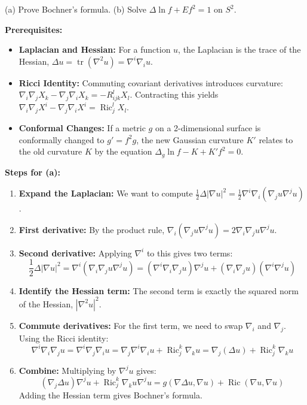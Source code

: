 \begin{exercise}
\label{geometry:2019:5}
(a) Prove Bochner's formula. (b) Solve $\Delta\ln f + Ef^{2} = 1$ on $S^2$.
\end{exercise}

\begin{solution}
\textbf{Prerequisites:}
\begin{itemize}
    \item \textbf{Laplacian and Hessian:} For a function $u$, the Laplacian is the trace of the Hessian, $\Delta u = \operatorname{tr}(\nabla^2 u) = \nabla^i \nabla_i u$.
    \item \textbf{Ricci Identity:} Commuting covariant derivatives introduces curvature: $\nabla_i \nabla_j X_k - \nabla_j \nabla_i X_k = -R_{ijk}^l X_l$. Contracting this yields $\nabla_i \nabla_j X^i - \nabla_j \nabla_i X^i = \operatorname{Ric}_j^l X_l$.
    \item \textbf{Conformal Changes:} If a metric $g$ on a 2-dimensional surface is conformally changed to $g' = f^2 g$, the new Gaussian curvature $K'$ relates to the old curvature $K$ by the equation $\Delta_g \ln f - K + K' f^2 = 0$.
\end{itemize}

\medskip
\textbf{Steps for (a):}
\begin{enumerate}
    \item \textbf{Expand the Laplacian:} We want to compute $\frac{1}{2} \Delta |\nabla u|^2 = \frac{1}{2} \nabla^i \nabla_i (\nabla_j u \nabla^j u)$.
    \item \textbf{First derivative:} By the product rule, $\nabla_i (\nabla_j u \nabla^j u) = 2 \nabla_i \nabla_j u \nabla^j u$.
    \item \textbf{Second derivative:} Applying $\nabla^i$ to this gives two terms:
    \[
    \frac{1}{2} \Delta |\nabla u|^2 = \nabla^i (\nabla_i \nabla_j u \nabla^j u) = (\nabla^i \nabla_i \nabla_j u) \nabla^j u + (\nabla_i \nabla_j u) (\nabla^i \nabla^j u)
    \]
    \item \textbf{Identify the Hessian term:} The second term is exactly the squared norm of the Hessian, $|\nabla^2 u|^2$.
    \item \textbf{Commute derivatives:} For the first term, we need to swap $\nabla_i$ and $\nabla_j$. Using the Ricci identity:
    \[
    \nabla^i \nabla_i \nabla_j u = \nabla^i \nabla_j \nabla_i u = \nabla_j \nabla^i \nabla_i u + \operatorname{Ric}_{j}^k \nabla_k u = \nabla_j (\Delta u) + \operatorname{Ric}_{j}^k \nabla_k u
    \]
    \item \textbf{Combine:} Multiplying by $\nabla^j u$ gives:
    \[
    (\nabla_j \Delta u) \nabla^j u + \operatorname{Ric}_{j}^k \nabla_k u \nabla^j u = g(\nabla \Delta u, \nabla u) + \operatorname{Ric}(\nabla u, \nabla u)
    \]
    Adding the Hessian term gives Bochner's formula.
\end{enumerate}


\end{solution}
